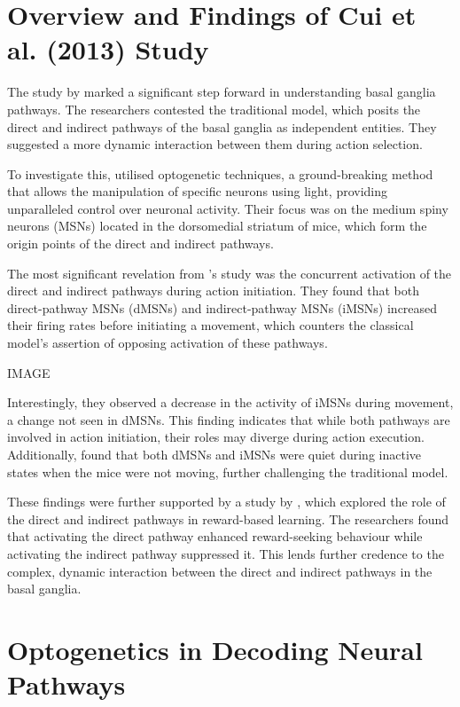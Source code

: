 \documentclass[10pt]{article}
\begin{document}
\begin{sloppypar}
  \section{Overview and Findings of Cui et al. (2013) Study}
  \label{sec:cui-et-al-2013}

  The study by \cite{cui_concurrent_2013} marked a significant step forward in understanding basal ganglia pathways. The researchers contested the traditional model, which posits the direct and indirect pathways of the basal ganglia as independent entities. They suggested a more dynamic interaction between them during action selection.

  To investigate this, \citeauthor{cui_concurrent_2013} utilised optogenetic techniques, a ground-breaking method that allows the manipulation of specific neurons using light, providing unparalleled control over neuronal activity. Their focus was on the medium spiny neurons (MSNs) located in the dorsomedial striatum of mice, which form the origin points of the direct and indirect pathways.

  The most significant revelation from \citeauthor{cui_concurrent_2013}’s study was the concurrent activation of the direct and indirect pathways during action initiation. They found that both direct-pathway MSNs (dMSNs) and indirect-pathway MSNs (iMSNs) increased their firing rates before initiating a movement, which counters the classical model’s assertion of opposing activation of these pathways.

  IMAGE

  Interestingly, they observed a decrease in the activity of iMSNs during movement, a change not seen in dMSNs. This finding indicates that while both pathways are involved in action initiation, their roles may diverge during action execution. Additionally, \cite{cui_concurrent_2013} found that both dMSNs and iMSNs were quiet during inactive states when the mice were not moving, further challenging the traditional model.

  These findings were further supported by a study by \cite{guillaumin_optogenetic_2020}, which explored the role of the direct and indirect pathways in reward-based learning. The researchers found that activating the direct pathway enhanced reward-seeking behaviour while activating the indirect pathway suppressed it. This lends further credence to the complex, dynamic interaction between the direct and indirect pathways in the basal ganglia.

  \section{Optogenetics in Decoding Neural Pathways}
  \label{sec:the-role-of-optogenetics-in-neural-pathways}


\end{sloppypar}
\end{document}
